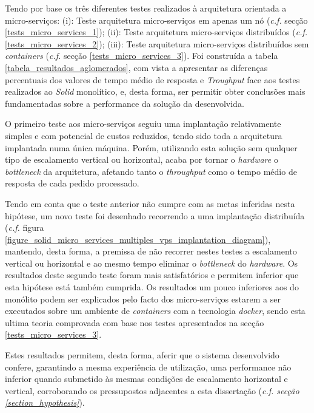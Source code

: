 Tendo por base os três diferentes testes realizados à arquitetura orientada a micro-serviços: (i): Teste arquitetura micro-serviços em apenas um nó (\emph{c.f.} secção \ref{tests_micro_services_1}); (ii): Teste arquitetura micro-serviços distribuídos (\emph{c.f.}\ref{tests_micro_services_2}); (iii): Teste arquitetura micro-serviços distribuídos sem \emph{containers} (\emph{c.f.} secção \ref{tests_micro_services_3}).
Foi construída a tabela \ref{tabela_resultados_aglomerados}, com vista a apresentar as diferenças percentuais dos valores de tempo médio de resposta e \emph{Troughput} face aos testes realizados ao \emph{Solid} monolítico, e, desta forma, ser permitir obter conclusões mais fundamentadas sobre a performance da solução da desenvolvida.

O primeiro teste aos micro-serviços seguiu uma implantação relativamente simples e com potencial de custos reduzidos, tendo sido toda a arquitetura implantada numa única máquina.
Porém, utilizando esta solução sem qualquer tipo de escalamento vertical ou horizontal, acaba por tornar o \emph{hardware} o \emph{bottleneck} da arquitetura, afetando tanto o \emph{throughput} como o tempo médio de resposta de cada pedido processado.

Tendo em conta que o teste anterior não cumpre com as metas inferidas nesta hipótese, um novo teste foi desenhado recorrendo a uma implantação distribuída (\emph{c.f.} figura \ref{figure_solid_micro_services_multiples_vps_implantation_diagram}), mantendo, desta forma, a premissa de não recorrer nestes testes a escalamento vertical ou horizontal e ao mesmo tempo eliminar o \emph{bottleneck} do \emph{hardware}. Os resultados deste segundo teste foram mais satisfatórios e permitem inferior que esta hipótese está também cumprida. Os resultados um pouco inferiores aos do monólito podem ser explicados pelo facto dos micro-serviços estarem a ser executados sobre um ambiente de \emph{containers} com a tecnologia \emph{docker}, sendo esta ultima teoria comprovada com base nos testes apresentados na secção \ref{tests_micro_services_3}.

Estes resultados permitem, desta forma, aferir que o sistema desenvolvido confere, garantindo a mesma experiência de utilização, uma performance não inferior quando submetido às mesmas condições de escalamento horizontal e vertical, corroborando os pressupostos adjacentes a esta dissertação (\emph{c.f. secção \ref{section_hypothesis}}).

